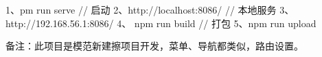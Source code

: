 
1、pm run serve  // 启动
2、http://localhost:8086/  // 本地服务
3、http://192.168.56.1:8086/
4、 npm run build  // 打包
5、npm run upload

备注：此项目是模范新建擦项目开发，菜单、导航都类似，路由设置。